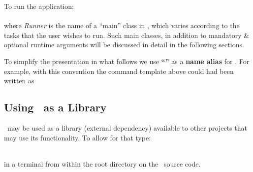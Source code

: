 \noindent To run the application: \\

\noindent {} \\

\noindent where \emph{Runner} is the name of a ``main'' class in \trail, which varies according to the tasks that the user wishes to run. Such main classes, in addition to mandatory \& optional runtime arguments will be discussed in detail in the following sections. \\

\begin{remark}
	To simplify the presentation in what follows we use \textbf{``''} as a \textbf{name alias} for  . For example, with this convention the command template above could had been written as \\
	
	\noindent {}
\end{remark}

\subsection{Using \trail \  as a Library}
\trail \ may be used as a library (external dependency) available to other projects that may use its functionality. To allow for that type:

\noindent {} \\

\noindent in a terminal from within the root directory on the \trail \ source code.

\newpage

 

